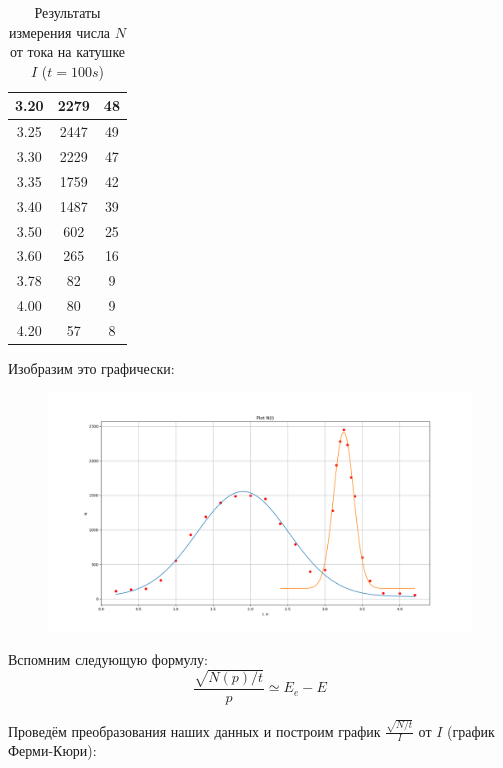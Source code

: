 \documentclass{article}
\begin{document}
\begin{table}[h]
\begin{tabular}{|c|c|c|}
3.20                      & 2279                      & 48 \\\hline
3.25                      & 2447                      & 49 \\\hline
3.30                      & 2229                      & 47 \\\hline
3.35                      & 1759                      & 42 \\\hline
3.40                      & 1487                      & 39 \\\hline
3.50                      & 602                       & 25 \\\hline
3.60                      & 265                       & 16 \\\hline
3.78                      & 82                        & 9  \\\hline
4.00                      & 80                        & 9  \\\hline
4.20                      & 57                        & 8  \\\hline
\end{tabular}
	\caption{Результаты измерения числа \(N\) от тока на катушке \(I\) (\(t = 100s\))}
\end{table}
Изобразим это графически:

\begin{figure}[H]
	\includegraphics[width=\textwidth]{I-N.png}
\end{figure}

Вспомним следующую формулу:
\[ \frac{\sqrt{N(p)/t}}{p} \simeq E_e - E \]

Проведём преобразования наших данных и построим график \(\frac{\sqrt{N/t}}{I}\) от \(I\)
(график Ферми-Кюри):
\end{document}
